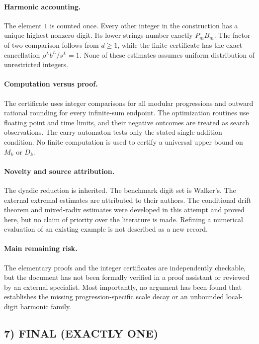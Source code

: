 \paragraph{Harmonic accounting.}
The element $1$ is counted once. Every other integer in the construction has a unique highest nonzero digit. Its lower strings number exactly $P_mB_m$. The factor-of-two comparison follows from $d\ge1$, while the finite certificate has the exact cancellation $\rho^L b^L/s^L=1$. None of these estimates assumes uniform distribution of unrestricted integers.

\paragraph{Computation versus proof.}
The certificate uses integer comparisons for all modular progressions and outward rational rounding for every infinite-sum endpoint. The optimization routines use floating point and time limits, and their negative outcomes are treated as search observations. The carry automaton tests only the stated single-addition condition. No finite computation is used to certify a universal upper bound on $M_k$ or $D_k$.

\paragraph{Novelty and source attribution.}
The dyadic reduction is inherited. The benchmark digit set is Walker's. The external extremal estimates are attributed to their authors. The conditional drift theorem and mixed-radix estimates were developed in this attempt and proved here, but no claim of priority over the literature is made. Refining a numerical evaluation of an existing example is not described as a new record.

\paragraph{Main remaining risk.}
The elementary proofs and the integer certificates are independently checkable, but the document has not been formally verified in a proof assistant or reviewed by an external specialist. Most importantly, no argument has been found that establishes the missing progression-specific scale decay or an unbounded local-digit harmonic family.

\subsection{7) FINAL (EXACTLY ONE)}

